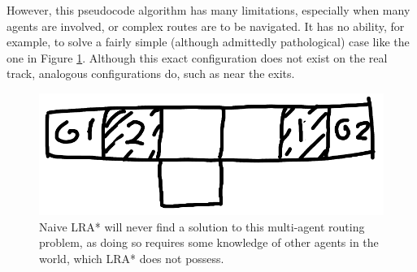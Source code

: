 \documentclass{article}
\begin{document}
However, this pseudocode algorithm has many limitations, especially when many
agents are involved, or complex routes are to be navigated. It has no ability,
for example, to solve a fairly simple (although admittedly pathological) case
like the one in Figure \ref{fig:LRA*-unsolveable}. Although this exact
configuration does not exist on the real track, analogous configurations do,
such as near the exits.
\begin{figure}
\caption{Naive LRA* will never find a solution to this multi-agent routing
problem, as doing so requires some knowledge of other agents in the world,
which LRA* does not possess.}
\label{fig:LRA*-unsolveable}
\includegraphics[width=\linewidth]{LRA*-unsolveable.png}
\end{figure}
\end{document}
